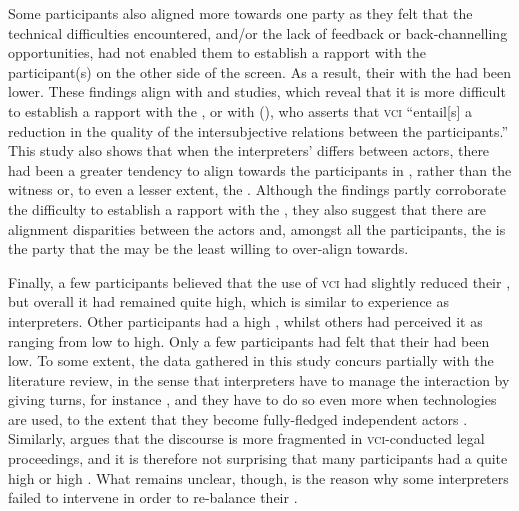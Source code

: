 \documentclass[output=paper]{langsci/langscibook}
\begin{document}
Some participants also aligned more towards one party as they felt that the technical difficulties encountered, and/or the lack of feedback or back-channell\-ing opportunities, had not enabled them to establish a rapport with the  participant(s) on the other side of the screen. As a result, their  with the  had been lower. These findings align with  and  studies, which reveal that it is more difficult to establish a rapport with the , or with \citeauthor{Braun2016b} (\citeyear[4]{Braun2016b}), who asserts that \textsc{vci} “entail[s] a reduction in the quality of the intersubjective relations between the participants.” This study also shows that when the interpreters’  differs between actors, there had been a greater tendency to align towards the participants in , rather than the witness or, to even a lesser extent, the . Although the findings partly corroborate the difficulty to establish a rapport with the , they also suggest that there are alignment disparities between the  actors and, amongst all the participants, the  is the party that the  may be the least willing to over-align towards.

Finally, a few participants believed that the use of \textsc{vci}  had slightly reduced their , but overall it had remained quite high, which is similar to  experience as  interpreters. Other participants had a high , whilst others had perceived it as ranging from low to high. Only a few participants had felt that their  had been low. To some extent, the data gathered in this study concurs partially with the literature review, in the sense that  interpreters have to manage the interaction by giving turns, for instance \citep{Angelelli2003,Llewellyn-Jones2014,Martin2008}, and they have to do so even more when technologies are used, to the extent that they become fully-fledged independent actors \citep{Lee2007,Rosenberg2007}. Similarly, \citet{Braun2016a} argues that the discourse is more fragmented in \textsc{vci}-conducted legal proceedings, and it is therefore not surprising that many participants had a quite high or high . What remains unclear, though, is the reason why some  interpreters failed to intervene in order to re-balance their . 
\end{document}
